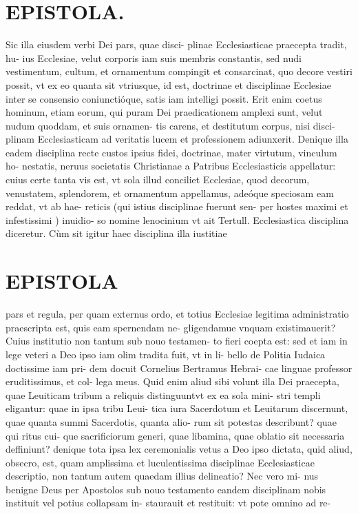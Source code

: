 \documentclass{article}
\begin{document}
\begin{pages}
\section*{EPISTOLA. }\pstart Sic illa eiusdem verbi Dei pars, quae disci- plinae Ecclesiasticae praecepta tradit, hu- ius Ecclesiae, velut corporis iam suis membris constantis, sed nudi vestimentum, cultum, et ornamentum compingit et consarcinat, quo decore vestiri possit, vt ex eo quanta sit vtriusque, id est, doctrinae et disciplinae Ecclesiae inter se consensio coniunctióque, satis iam intelligi possit. Erit enim coetus hominum, etiam eorum, qui puram Dei praedicationem amplexi sunt, velut nudum quoddam, et suis ornamen- tis carens, et destitutum corpus, nisi disci- plinam Ecclesiasticam ad veritatis lucem et professionem adiunxerit. Denique illa eadem disciplina recte custos ipsius fidei, doctrinae, mater virtutum, vinculum ho- nestatis, neruus societatis Christianae a Patribus Ecclesiasticis appellatur: cuius certe tanta vis est, vt sola illud conciliet Ecclesiae, quod decorum, venustatem, splendorem, et ornamentum appellamus, adeóque speciosam eam reddat, vt ab hae- reticis (qui istius disciplinae fuerunt sen- per hostes maximi et infestissimi ) inuidio- so nomine lenocinium vt ait Tertull. Ecclesiastica disciplina diceretur. Cùm sit igitur haec disciplina illa iustitiae  \pend
\section*{EPISTOLA }\pstart pars et regula, per quam externus ordo, et totius Ecclesiae legitima administratio praescripta est, quis eam spernendam ne- gligendamue vnquam existimauerit? Cuius institutio non tantum sub nouo testamen- to fieri coepta est: sed et iam in lege veteri a Deo ipso iam olim tradita fuit, vt in li- bello de Politia Iudaica doctissime iam pri- dem docuit Cornelius Bertramus Hebrai- cae linguae professor eruditissimus, et col- lega meus. Quid enim aliud sibi volunt illa Dei praecepta, quae Leuiticam tribum a reliquis distinguuntvt ex ea sola mini- stri templi eligantur: quae in ipsa tribu Leui- tica iura Sacerdotum et Leuitarum discernunt, quae quanta summi Sacerdotis, quanta alio- rum sit potestas describunt? quae qui ritus cui- que  sacrificiorum generi, quae libamina, quae oblatio sit necessaria deffiniunt? denique tota ipsa lex ceremonialis vetus a Deo ipso dictata, quid aliud, obsecro, est, quam amplissima et luculentissima disciplinae Ecclesiasticae descriptio, non tantum autem quaedam illius delineatio? Nec vero mi- nus benigne Deus per Apostolos sub nouo testamento eandem disciplinam nobis instituit vel potius collapsam in- staurauit et restituit: vt pote omnino ad re-  \pend

\end{pages}
\end{document}
